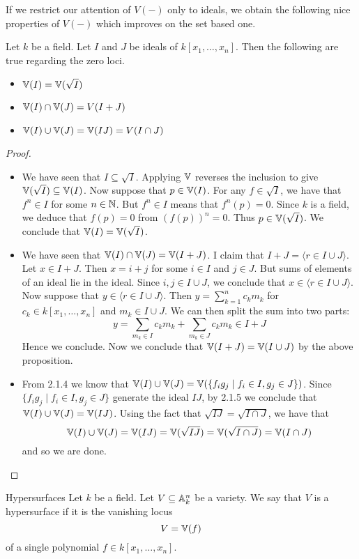 \documentclass[a4paper]{article}
\begin{document}
If we restrict our attention of $V(-)$ only to ideals, we obtain the following nice properties of $V(-)$ which improves on the set based one. 

\begin{prp}{}{} Let $k$ be a field. Let $I$ and $J$ be ideals of $k[x_1,\dots,x_n]$. Then the following are true regarding the zero loci. 
\begin{itemize}
\item $\mathbb{V}(I)=\mathbb{V}(\sqrt{I})$
\item $\mathbb{V}(I)\cap\mathbb{V}(J)=V(I+J)$
\item $\mathbb{V}(I)\cup\mathbb{V}(J)=\mathbb{V}(IJ)=V(I\cap J)$
\end{itemize}\tcbline
\begin{proof}~\\
\begin{itemize}
\item We have seen that $I\subseteq\sqrt{I}$. Applying $\mathbb{V}$ reverses the inclusion to give $\mathbb{V}(\sqrt{I})\subseteq\mathbb{V}(I)$. Now suppose that $p\in\mathbb{V}(I)$. For any $f\in\sqrt{I}$, we have that $f^n\in I$ for some $n\in\mathbb{N}$. But $f^n\in I$ means that $f^n(p)=0$. Since $k$ is a field, we deduce that $f(p)=0$ from $(f(p))^n=0$. Thus $p\in\mathbb{V}(\sqrt{I})$. We conclude that $\mathbb{V}(I)=\mathbb{V}(\sqrt{I})$. 
\item We have seen that $\mathbb{V}(I)\cap\mathbb{V}(J)=\mathbb{V}(I+J)$. I claim that $I+J=\langle r\in I\cup J\rangle$. Let $x\in I+J$. Then $x=i+j$ for some $i\in I$ and $j\in J$. But sums of elements of an ideal lie in the ideal. Since $i,j\in I\cup J$, we conclude that $x\in\langle r\in I\cup J\rangle$. Now suppose that $y\in\langle r\in I\cup J\rangle$. Then $y=\sum_{k=1}^nc_km_k$ for $c_k\in k[x_1,\dots,x_n]$ and $m_k\in I\cup J$. We can then split the sum into two parts: $$y=\sum_{m_k\in I}c_km_k+\sum_{m_k\in J}c_km_k\in I+J$$ Hence we conclude. Now we conclude that $\mathbb{V}(I+J)=\mathbb{V}(I\cup J)$ by the above proposition. 
\item From 2.1.4 we know that $\mathbb{V}(I)\cup\mathbb{V}(J)=\mathbb{V}(\{f_ig_j\;|\;f_i\in I, g_j\in J\})$. Since $\{f_ig_j\;|\;f_i\in I,g_j\in J\}$ generate the ideal $IJ$, by 2.1.5 we conclude that $\mathbb{V}(I)\cup\mathbb{V}(J)=\mathbb{V}(IJ)$. Using the fact that $\sqrt{IJ}=\sqrt{I\cap J}$, we have that $$\mathbb{V}(I)\cup\mathbb{V}(J)=\mathbb{V}(IJ)=\mathbb{V}(\sqrt{IJ})=\mathbb{V}(\sqrt{I\cap J})=\mathbb{V}(I\cap J)$$ and so we are done. 
\end{itemize}
\end{proof}
\end{prp}

\begin{defn}{Hypersurfaces}{} Let $k$ be a field. Let $V\subseteq\mathbb{A}_k^n$ be a variety. We say that $V$ is a hypersurface if it is the vanishing locus $$V=\mathbb{V}(f)$$ of a single polynomial $f\in k[x_1,\dots,x_n]$. 
\end{defn}
\end{document}
